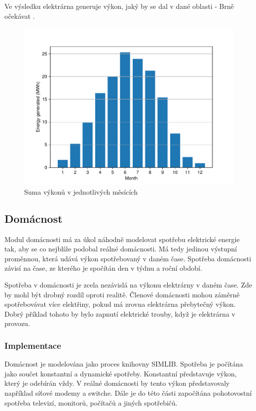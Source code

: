 \documentclass[12pt,a4paper]{article}
\begin{document}
Ve výsledku elektrárna generuje výkon, jaký by se dal v dané oblasti - Brně očekávat \cite{Zilvar-2022}.

\begin{figure}[t]
\begin{center}
\includegraphics[width=0.8\linewidth]{img/solar_power_hist.pdf}
\end{center}
\caption{Suma výkonů v jednotlivých měsících}
\label{fig:solar_power_hist}
\end{figure}

\subsection{Domácnost}
Modul domácnosti má za úkol náhodně modelovat spotřebu elektrické energie tak,
aby se co nejblíže podobal reálné domácnosti.
Má tedy jedinou výstupní proměnnou, která udává výkon spotřebovaný v daném čase.
Spotřeba domácnosti závisí na čase, ze kterého je spočítán den v týdnu a roční období.

Spotřeba v domácnosti je zcela nezávislá na výkonu elektrárny v daném čase.
Zde by mohl být drobný rozdíl oproti realitě.
Členové domácnosti mohou záměrně spotřebovávat více elektřiny, pokud má zrovna elektrárna přebytečný výkon.
Dobrý příklad tohoto by bylo zapnutí elektrické trouby, když je elektrárna v provozu.

\subsubsection{Implementace}
Domácnost je modelována jako proces knihovny SIMLIB.
Spotřeba je počítána jako součet konstantní a dynamické spotřeby.
Konstantní představuje výkon, který je odebírán vždy.
V reálné domácnosti by tento výkon představovaly například síťové modemy a switche.
Dále je do této části započítána pohotovostní spotřeba televizí, monitorů, počítačů a jiných spotřebičů.
\end{document}
